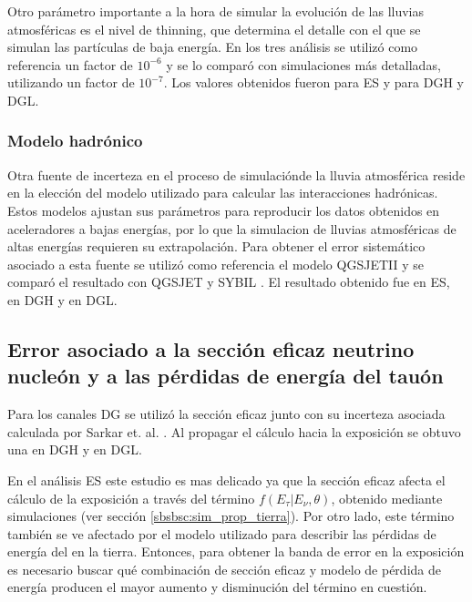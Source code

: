 		Otro parámetro importante a la hora de simular la evolución de las lluvias atmosféricas es el nivel de thinning, que determina el detalle con el que se simulan las partículas de baja energía.
		En los tres análisis se utilizó como referencia un factor de $10^{-6}$ y se lo comparó con simulaciones más detalladas, utilizando un factor de $10^{-7}$.
		Los valores obtenidos fueron  para ES y  para DGH y DGL.
		
		\subsubsection{Modelo hadrónico}
		
		Otra fuente de incerteza en el proceso de simulaciónde la lluvia atmosférica reside en la elección del modelo utilizado para calcular las interacciones hadrónicas.
		Estos modelos ajustan sus parámetros para reproducir los datos obtenidos en aceleradores a bajas energías, por lo que la simulacion de lluvias atmosféricas de altas energías requieren su extrapolación.
		Para obtener el error sistemático asociado a esta fuente se utilizó como referencia el modelo QGSJETII \cite{qgsjetii} y se comparó el resultado con QGSJET \cite{qgsjet} y SYBIL \cite{sybil}.
		El resultado obtenido fue  en ES,  en DGH y  en DGL.
		
	\subsection{Error asociado a la sección eficaz neutrino nucleón y a las pérdidas de energía del tauón}
	
	Para los canales DG se utilizó la sección eficaz junto con su incerteza asociada calculada por Sarkar et. al. \cite{cooper_sarkar}.
	Al propagar el cálculo hacia la exposición se obtuvo una  en DGH y  en DGL.
	
	En el an\'alisis ES este estudio es mas delicado ya que la sección eficaz afecta el cálculo de la exposición a través del término $f(E_\tau|E_\nu,\theta)$, obtenido mediante simulaciones (ver sección \ref{sbsbsc:sim_prop_tierra}).
	Por otro lado, este término también se ve afectado por el modelo utilizado para describir las pérdidas de energía del \tauon{} en la tierra.
	Entonces, para obtener la banda de error en la exposición es necesario buscar qué combinación de sección eficaz y modelo de pérdida de energía producen el mayor aumento y disminución del término en cuestión.
	

